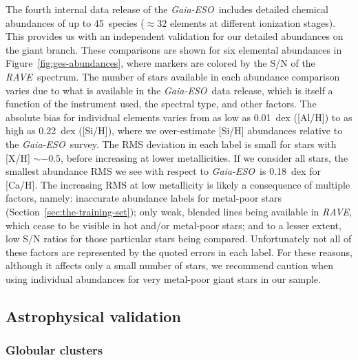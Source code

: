 \documentclass[preprint,trackchanges]{aastex}
\newcommand{\acronym}[1]{{\small{#1}}}
\newcommand{\project}[1]{\textsl{#1}}
\newcommand{\rave}{\project{\acronym{RAVE}}}
\newcommand{\ges}{\project{Gaia-ESO}}
\begin{document}
The fourth internal data release of the \ges\ includes detailed chemical
abundances of up to 45~species ($\approx32$ elements at different ionization
stages).  This provides us with an independent validation for our detailed
abundances on the giant branch.  These comparisons are shown for six elemental
abundances in Figure~\ref{fig:ges-abundances}, where markers are colored by the
S/N of the \rave\ spectrum.  The number of stars available in each abundance
comparison varies due to what is available in the \ges\ data release, which
is itself a function of the instrument used, the spectral type, and other
factors.  The absolute bias for individual elements varies from as low as
0.01~dex ([Al/H]) to as high as 0.22~dex ([Si/H]), where we over-estimate 
[Si/H] abundances relative to the \ges\ survey. The RMS deviation in each
label is small for stars with [X/H] $\sim -0.5$, before increasing at lower
metallicities.  If we consider all stars, the smallest abundance RMS we see
with respect to \ges\ is 0.18~dex for [Ca/H].  The increasing RMS at low 
metallicity is likely a consequence of multiple factors, namely: inaccurate
abundance labels for metal-poor stars (Section~\ref{sec:the-training-set});
only weak, blended lines being available in \rave, which cease to be visible
in hot and/or metal-poor stars; and to a lesser extent, low S/N ratios for 
those particular stars being compared.  Unfortunately not all of these
factors are represented by the quoted errors in each label.  For these reasons, 
although it affects only a small number of stars, we recommend caution when 
using individual abundances for very metal-poor giant stars in our sample.

\subsection{Astrophysical validation}
\label{sec:astrophysical-validation}

\subsubsection{Globular clusters}
\label{sec:globular-cluster-validation}
\end{document}
